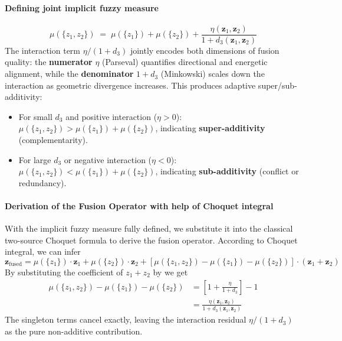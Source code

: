 \documentclass[12pt]{article}
\begin{document}
\paragraph{Defining joint implicit fuzzy measure }
\begin{equation*}
    \mu(\{z_1, z_2\}) \;=\; \mu(\{z_1\}) + \mu(\{z_2\}) + \frac{\eta(\mathbf{z}_1, \mathbf{z}_2)}{1 + d_3(\mathbf{z}_1, \mathbf{z}_2)}
\end{equation*}
The interaction term $\eta/(1{+}d_3)$ jointly encodes both dimensions of fusion quality: the \textbf{numerator} $\eta$ (Parseval) quantifies directional and energetic alignment, while the \textbf{denominator} $1+d_3$ (Minkowski) scales down the interaction as geometric divergence increases. This produces adaptive super/sub-additivity:
\begin{itemize}
    \item For small $d_3$ and positive interaction ($\eta > 0$): $\mu(\{z_1, z_2\}) > \mu(\{z_1\}) + \mu(\{z_2\})$, indicating \textbf{super-additivity} (complementarity).
    \item For large $d_3$ or negative interaction ($\eta < 0$): $\mu(\{z_1, z_2\}) < \mu(\{z_1\}) + \mu(\{z_2\})$, indicating \textbf{sub-additivity} (conflict or redundancy).
\end{itemize}

\paragraph{Derivation of the Fusion Operator with help of Choquet integral}
With the implicit fuzzy measure fully defined, we substitute it into the classical two-source Choquet formula to derive the fusion operator. According to Choquet integral, we can infer
\begin{equation*}
\mathbf{z}_{\text{fused}} = \mu(\{z_1\}) \cdot \mathbf{z}_1 + \mu(\{z_2\}) \cdot \mathbf{z}_2 + [ \mu(\{z_1, z_2\}) - \mu(\{z_1\}) - \mu(\{z_2\}) ] \cdot (\mathbf{z}_1 + \mathbf{z}_2)
\end{equation*}
 By substituting the coefficient of $z_1+z_2$ by we get
\begin{equation*}
\begin{aligned}
    \mu(\{z_1, z_2\}) - \mu(\{z_1\}) - \mu(\{z_2\}) &= \left[ 1 + \frac{\eta}{1+d_3} \right] - 1 \\
    &= \frac{\eta(\mathbf{z}_1, \mathbf{z}_2)}{1 + d_3(\mathbf{z}_1, \mathbf{z}_2)}
\end{aligned}
\end{equation*}
The singleton terms cancel exactly, leaving the interaction residual $\eta/(1+d_3)$ as the pure non-additive contribution.
\end{document}
